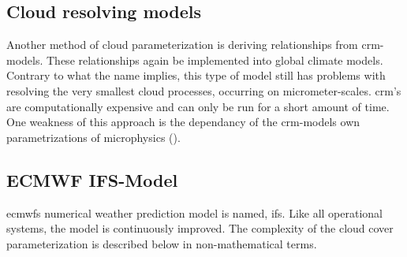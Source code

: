 \subsection{Cloud resolving models} \label{sec:params_climate_models}
Another method of cloud parameterization is deriving relationships from \acrfull{crm}-models. These relationships again be implemented into global climate models. Contrary to what the name implies, this type of model still has problems with resolving the very smallest cloud processes, occurring on micrometer-scales. 
\acrshort{crm}'s are computationally expensive and can only be run for a short amount of time. One weakness of this approach is the dependancy of the \acrshort{crm}-models own parametrizations of microphysics (\cite{Tomkins2005}). %

\subsection{ECMWF IFS-Model} \label{sec:era5_param}
\acrfull{ecmwf}s numerical weather prediction model is named, \acrfull{ifs}. Like all operational systems, the model is continuously improved. The complexity of the cloud cover parameterization is described below in non-mathematical terms. 


